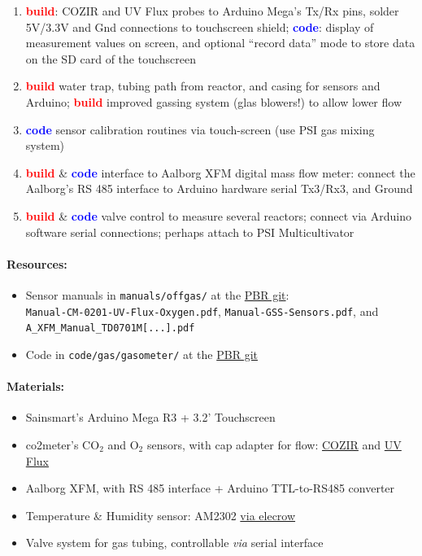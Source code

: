 \documentclass[12pt,a4paper]{scrartcl}
\newcommand{\git}[0]{\href{https://github.com/raim/PBR}{PBR git}}
\newcommand{\build}[0]{\textcolor{red}{\textbf{build}}}
\newcommand{\code}[0]{\textcolor{blue}{\textbf{code}}}
\newcommand{\ox}[0]{O$_2$}
\newcommand{\cox}[0]{CO$_2$}
\begin{document}
\begin{enumerate}
\item \build{}: COZIR and UV Flux probes to Arduino Mega's Tx/Rx pins,
  solder 5V/3.3V and Gnd connections to touchscreen shield; \code{}:
  display of measurement values on screen, and optional ``record
  data'' mode to store data on the SD card of the touchscreen
\item \build{} water trap, tubing path from reactor, and casing for
  sensors and Arduino; \build{} improved gassing system (glas
  blowers!) to allow lower flow
\item \code{} sensor calibration routines via touch-screen (use PSI
  gas mixing system)
\item \build{} \& \code{} interface to Aalborg XFM digital mass flow
  meter: connect the Aalborg's RS 485 interface to Arduino hardware
  serial Tx3/Rx3, and Ground
\item \build{} \& \code{} valve control to measure several reactors;
  connect via Arduino software serial connections; perhaps attach to
  PSI Multicultivator
\end{enumerate}

\paragraph{Resources:}
\begin{itemize}
\item Sensor manuals in \texttt{manuals/offgas/} at the
  \git{}:\\
  \texttt{Manual-CM-0201-UV-Flux-Oxygen.pdf},
  \texttt{Manual-GSS-Sensors.pdf}, and\\
  \texttt{A\_XFM\_Manual\_TD0701M[...].pdf}
\item Code in  \texttt{code/gas/gasometer/} at the
  \git{}
\end{itemize}

\paragraph{Materials:}

\begin{itemize}
\item Sainsmart's Arduino Mega R3 + 3.2' Touchscreen 
\item co2meter's \cox{} and \ox{} sensors, with cap adapter for flow:
  \href{http://www.co2meter.com/collections/co2-sensors/products/cozir-5-100-co2-sensor}{COZIR} and \href{http://www.co2meter.com/collections/co2-sensors/products/uv-flux-oxygen-sensor}{UV Flux}
\item Aalborg XFM, with RS 485 interface + Arduino TTL-to-RS485 converter
\item Temperature \& Humidity sensor: AM2302 \href{http://www.elecrow.com/temperature-humidity-sensor-proam2302-p-513.html}{via elecrow}
\item Valve system for gas tubing, controllable \textit{via} serial
  interface
\end{itemize}
\end{document}
